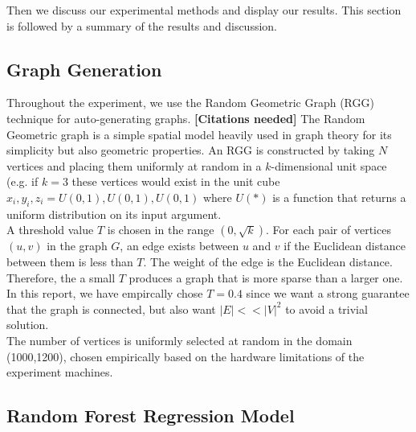 \documentclass[journal]{IEEEtran}
\begin{document}
	Then we discuss our experimental methods and display our results. This section is followed by
	a summary of the results and discussion.
	\subsection{Graph Generation}
		Throughout the experiment, we use the Random Geometric Graph (RGG) technique for auto-generating graphs.
		{\bf{[Citations needed]}}
		The Random Geometric graph is a simple spatial model heavily used in graph theory for its simplicity
		but also geometric properties. An RGG is constructed by taking $N$ vertices and placing them
		uniformly at random in a $k$-dimensional unit space (e.g. if $k=3$ these vertices would exist in
		the unit cube $x_i,y_i,z_i = U(0,1),U(0,1),U(0,1)$ where $U(*)$ is a function that returns a uniform
		distribution on its input argument.\\
		
		A threshold value $T$ is chosen in the range $(0,\sqrt{k})$. For each pair of vertices $(u,v)$ in
		the graph $G$, an edge exists between $u$ and $v$ if the Euclidean distance between them is less
		than $T$. The weight of the edge is the Euclidean distance. Therefore, the a small $T$ produces a
		graph that is more sparse than a larger one. In this report, we have empircally chose $T=0.4$
		since we want a strong guarantee that the graph is connected, but also want $|E| << |V|^2$ to
		avoid a trivial solution.\\
		
		The number of vertices is uniformly selected at random in the domain (1000,1200), chosen empirically
		based on the hardware limitations of the experiment machines.
		
	\subsection{Random Forest Regression Model}
\end{document}
